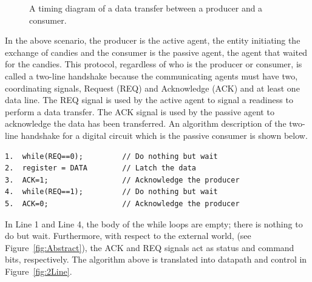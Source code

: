 \begin{figure}[ht]
\caption{A timing diagram of a data transfer between a producer and a consumer.}
\label{fig:ProdConTime}
\end{figure}

In the above scenario, the producer is the active agent, the
entity initiating the exchange of candies and the consumer is 
the passive agent, the agent that waited for the candies.  This 
protocol, regardless of who is the producer or consumer, is called a 
two-line handshake because the communicating agents must have 
two, coordinating signals, Request (REQ) and Acknowledge (ACK) and at
least one data line.  The REQ signal is used by the active 
agent to signal a readiness to perform a data transfer.  The ACK 
signal is used by the passive agent to acknowledge the data has been 
transferred.  An algorithm description of the two-line handshake for a
digital circuit which is the passive consumer is shown below.

\begin{verbatim}
1.  while(REQ==0);         // Do nothing but wait
2.  register = DATA        // Latch the data
3.  ACK=1;                 // Acknowledge the producer
4.  while(REQ==1);         // Do nothing but wait
5.  ACK=0;                 // Acknowledge the producer
\end{verbatim}

In Line 1 and Line 4, the body of the while loops are empty; there is nothing
to do but wait.  Furthermore, with respect to the external world, (see
Figure~\ref{fig:Abstract}), the ACK and REQ signals act as status and 
command bits, respectively.  The algorithm above is translated into
datapath and control in Figure~\ref{fig:2Line}.

